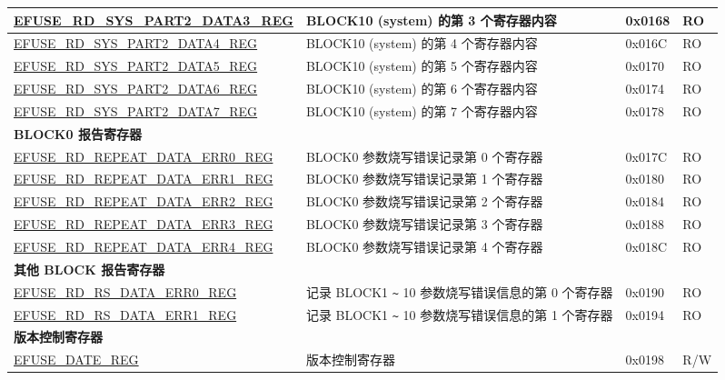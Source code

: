 \begin{longtable}{ | p{6.8cm} | p{7cm} | p{1.3cm} | p{1.2cm} | }
    \hyperref[regdesc:EFUSERDSYSPART2DATANREG]{EFUSE\_RD\_SYS\_PART2\_DATA3\_REG} & BLOCK10 (system) 的第 3 个寄存器内容 & 0x0168 & RO \\ \hline
    \hyperref[regdesc:EFUSERDSYSPART2DATANREG]{EFUSE\_RD\_SYS\_PART2\_DATA4\_REG} & BLOCK10 (system) 的第 4 个寄存器内容 & 0x016C & RO \\ \hline
    \hyperref[regdesc:EFUSERDSYSPART2DATANREG]{EFUSE\_RD\_SYS\_PART2\_DATA5\_REG} & BLOCK10 (system) 的第 5 个寄存器内容 & 0x0170 & RO \\ \hline
    \hyperref[regdesc:EFUSERDSYSPART2DATANREG]{EFUSE\_RD\_SYS\_PART2\_DATA6\_REG} & BLOCK10 (system) 的第 6 个寄存器内容 & 0x0174 & RO \\ \hline
    \hyperref[regdesc:EFUSERDSYSPART2DATANREG]{EFUSE\_RD\_SYS\_PART2\_DATA7\_REG} & BLOCK10 (system) 的第 7 个寄存器内容 & 0x0178 & RO \\ \hline
    \multicolumn{4}{|l|}{\textbf{BLOCK0 报告寄存器}} \\ \hline
    \hyperref[regdesc:EFUSERDREPEATDATAERR0REG]{EFUSE\_RD\_REPEAT\_DATA\_ERR0\_REG} & BLOCK0 参数烧写错误记录第 0 个寄存器 & 0x017C & RO \\ \hline
    \hyperref[regdesc:EFUSERDREPEATDATAERR1REG]{EFUSE\_RD\_REPEAT\_DATA\_ERR1\_REG} & BLOCK0 参数烧写错误记录第 1 个寄存器 & 0x0180 & RO \\ \hline
    \hyperref[regdesc:EFUSERDREPEATDATAERR2REG]{EFUSE\_RD\_REPEAT\_DATA\_ERR2\_REG} & BLOCK0 参数烧写错误记录第 2 个寄存器 & 0x0184 & RO \\ \hline
    \hyperref[regdesc:EFUSERDREPEATDATAERR3REG]{EFUSE\_RD\_REPEAT\_DATA\_ERR3\_REG} & BLOCK0 参数烧写错误记录第 3 个寄存器 & 0x0188 & RO \\ \hline
    \hyperref[regdesc:EFUSERDREPEATDATAERR4REG]{EFUSE\_RD\_REPEAT\_DATA\_ERR4\_REG} & BLOCK0 参数烧写错误记录第 4 个寄存器 & 0x018C & RO \\ \hline
    \multicolumn{4}{|l|}{\textbf{其他 BLOCK 报告寄存器}} \\ \hline
    \hyperref[regdesc:EFUSERDRSDATAERR0REG]{EFUSE\_RD\_RS\_DATA\_ERR0\_REG} & 记录 BLOCK1 \verb+~+ 10 参数烧写错误信息的第 0 个寄存器 & 0x0190 & RO \\ \hline
    \hyperref[regdesc:EFUSERDRSDATAERR1REG]{EFUSE\_RD\_RS\_DATA\_ERR1\_REG} & 记录 BLOCK1 \verb+~+ 10 参数烧写错误信息的第 1 个寄存器 & 0x0194 & RO \\ \hline
    \multicolumn{4}{|l|}{\textbf{版本控制寄存器}} \\ \hline
    \hyperref[regdesc:EFUSEDATEREG]{EFUSE\_DATE\_REG} & 版本控制寄存器 & 0x0198 & R/W \\ \hline

\end{longtable}
